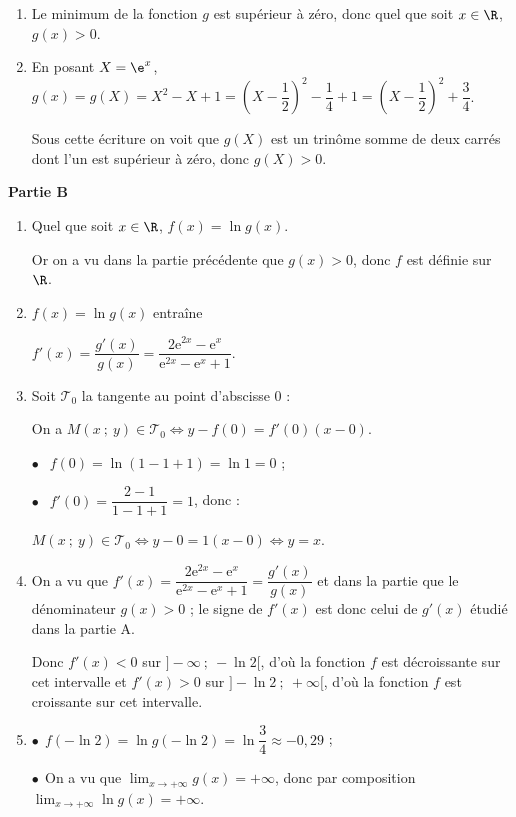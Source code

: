\begin{enumerate}
\item 
Le minimum de la fonction $g$ est supérieur à zéro, donc quel que soit $x \in \R$, \, $g(x) > 0.$
\item 


En posant $X = \e^x$, $g(x) = g(X) = X^2 - X +1 = \left(X - \dfrac12 \right)^2 - \dfrac14 + 1 = \left(X - \dfrac12 \right)^2 + \dfrac34$.

Sous cette écriture on voit que $g(X)$ est un trinôme somme de deux carrés dont l'un est supérieur à zéro, donc $g(X) > 0$.
\end{enumerate}

\medskip

\textbf{Partie B}

\medskip

\begin{enumerate}
\item 

Quel que soit $x \in \R$, \: $f(x) = \ln g(x)$.

Or on a vu dans la partie précédente que $g(x) > 0$, donc $f$ est définie sur $\R$.
\item 


$f(x) = \ln g(x)$ entraîne 

$f'(x) = \dfrac{g'(x)}{g(x)} = \dfrac{2\text{e}^{2x} - \text{e}^x}{\text{e}^{2x} - \text{e}^x + 1}$.
\item 
Soit $\mathcal{T}_0$ la tangente au point d'abscisse $0$ :

On a $M(x~;~y) \in \mathcal{T}_0 \iff y - f(0) = f'(0)(x - 0)$.

$\bullet ~~$ $f(0) = \ln(1 - 1 + 1) = \ln 1 = 0$ ;

$\bullet ~~$ $f'(0) = \dfrac{2 - 1}{1 - 1 + 1} = 1$, donc :

$M(x~;~y) \in \mathcal{T}_0 \iff y - 0 = 1(x - 0) \iff y = x$.
\item 
On a vu que $f'(x) = \dfrac{2\text{e}^{2x} - \text{e}^x}{\text{e}^{2x} - \text{e}^x + 1} = \dfrac{g'(x)}{g(x)}$ et dans la partie que le dénominateur $g(x) > 0$ ; le signe de $f'(x)$ est donc celui de $g'(x)$ étudié dans la partie A.

Donc $f'(x) < 0$ sur $]- \infty~;~- \ln 2[$, d'où la fonction $f$ est décroissante sur cet intervalle et $f'(x) > 0$ sur $]- \ln 2~;~+ \infty[$, d'où la fonction $f$ est croissante sur cet intervalle.
\item 
$\bullet~~$$f(-\ln 2) = \ln g(- \ln 2) =\ln \dfrac34 \approx- 0,29$ ;

$\bullet~~$On a vu que $\displaystyle\lim_{x \to + \infty} g(x) = + \infty$, donc par composition 
$\displaystyle\lim_{x \to + \infty} \ln g(x) = + \infty$.


\end{enumerate}
